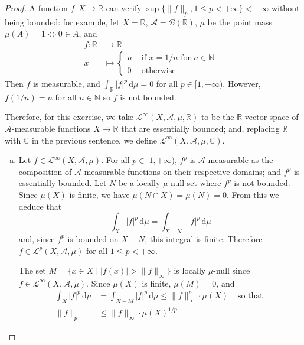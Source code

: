 \documentclass[11pt,a4paper,twoside]{article}
\theoremstyle{definition}
\begin{document}
\begin{proof}

  A function $f : X \to \mathbb{R}$ can verify $\sup \{ \| f \|_p, 1 \leq p < +\infty \} < +\infty$ without being bounded:
  for example, let $X = \mathbb{R}$, $\mathscr{A} = \mathscr{B} (\mathbb{R})$, $\mu$ be the point mass $\mu (A) = 1 \iff 0 \in A$,
  and
  \begin{align*}
    f : \mathbb{R} &\to \mathbb{R} \\
    x &\mapsto \begin{cases}
      n &\text { if } x = 1 / n \text{ for } n \in \mathbb{N}_+ \\
      0 &\text{ otherwise }
    \end{cases}
  \end{align*}
  Then $f$ is measurable, and $\int_\mathbb{R} | f |^p \,\mathrm{d}\mu = 0$ for all $p \in [1, +\infty )$.
    However, $f (1 / n) = n$ for all $n \in \mathbb{N}$ so $f$ is not bounded.

    Therefore, for this exercise, we take $\mathscr{L}^\infty (X, \mathscr{A}, \mu, \mathbb{R})$ to be the $\mathbb{R}$-vector space
    of $\mathscr{A}$-measurable functions $X \to \mathbb{R}$ that are essentially bounded; and, replacing $\mathbb{R}$ with $\mathbb{C}$ in the previous sentence,
    we define $\mathscr{L}^\infty (X, \mathscr{A}, \mu, \mathbb{C})$.

  \begin{enumerate}[(a)]

  \item Let $f \in \mathscr{L}^\infty (X, \mathscr{A}, \mu)$. For all $p \in [1, +\infty)$, $f^p$ is $\mathscr{A}$-measurable
    as the composition of $\mathscr{A}$-measurable functions on their respective domains; and $f^p$ is essentially bounded.
    Let $N$ be a locally $\mu$-null set where $f^p$ is not bounded. Since $\mu (X)$ is finite, we have $\mu (N \cap X) = \mu (N) = 0$.
    From this we deduce that
    \begin{equation*}
      \int_X | f |^p \,\mathrm{d}\mu = \int_{X - N} | f |^p \,\mathrm{d}\mu
    \end{equation*}
    and, since $f^p$ is bounded on $X - N$, this integral is finite. Therefore $f \in \mathscr{L}^p (X, \mathscr{A}, \mu)$ for all $1 \leq p < +\infty$.

    The set $M = \{ x \in X \mid | f (x) | > \| f \|_\infty \}$ is locally $\mu$-null since $f \in \mathscr{L}^\infty (X, \mathscr{A}, \mu)$.
    Since $\mu (X)$ is finite, $\mu (M) = 0$, and
    \begin{align*}
      \int_X | f |^p \,\mathrm{d}\mu &= \int_{X - M} | f |^p \,\mathrm{d}\mu \leq \| f \|_\infty^p \cdot \mu (X) &\text{ so that } \\
      \| f \|_p &\leq \| f \|_\infty \cdot \mu (X)^{1 / p}
    \end{align*}


\end{enumerate}
\end{proof}
\end{document}

